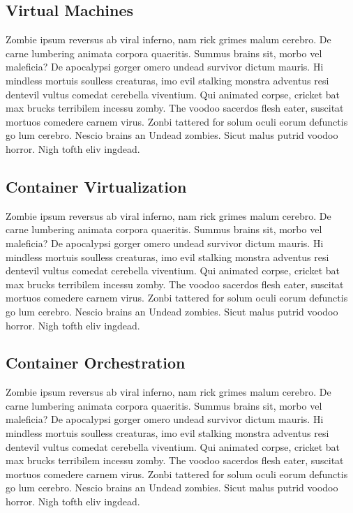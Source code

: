 \subsection{Virtual Machines}
Zombie ipsum reversus ab viral inferno, nam rick grimes malum cerebro.
De carne lumbering animata corpora quaeritis.
Summus brains sit, morbo vel maleficia?
De apocalypsi gorger omero undead survivor dictum mauris. Hi mindless mortuis soulless creaturas, imo evil stalking monstra adventus resi dentevil vultus comedat cerebella viventium.
Qui animated corpse, cricket bat max brucks terribilem incessu zomby.
The voodoo sacerdos flesh eater, suscitat mortuos comedere carnem virus.
Zonbi tattered for solum oculi eorum defunctis go lum cerebro.
Nescio brains an Undead zombies.
Sicut malus putrid voodoo horror.
Nigh tofth eliv ingdead.

\subsection{Container Virtualization}
Zombie ipsum reversus ab viral inferno, nam rick grimes malum cerebro.
De carne lumbering animata corpora quaeritis.
Summus brains sit, morbo vel maleficia?
De apocalypsi gorger omero undead survivor dictum mauris. Hi mindless mortuis soulless creaturas, imo evil stalking monstra adventus resi dentevil vultus comedat cerebella viventium.
Qui animated corpse, cricket bat max brucks terribilem incessu zomby.
The voodoo sacerdos flesh eater, suscitat mortuos comedere carnem virus.
Zonbi tattered for solum oculi eorum defunctis go lum cerebro.
Nescio brains an Undead zombies.
Sicut malus putrid voodoo horror.
Nigh tofth eliv ingdead.

\subsection{Container Orchestration}
Zombie ipsum reversus ab viral inferno, nam rick grimes malum cerebro.
De carne lumbering animata corpora quaeritis.
Summus brains sit, morbo vel maleficia?
De apocalypsi gorger omero undead survivor dictum mauris. Hi mindless mortuis soulless creaturas, imo evil stalking monstra adventus resi dentevil vultus comedat cerebella viventium.
Qui animated corpse, cricket bat max brucks terribilem incessu zomby.
The voodoo sacerdos flesh eater, suscitat mortuos comedere carnem virus.
Zonbi tattered for solum oculi eorum defunctis go lum cerebro.
Nescio brains an Undead zombies.
Sicut malus putrid voodoo horror.
Nigh tofth eliv ingdead.

